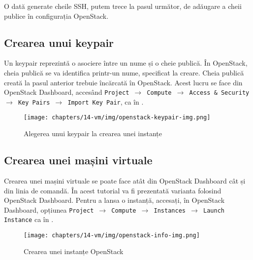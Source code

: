 
O dată generate cheile SSH, putem trece la pasul următor, de adăugare a cheii publice în configurația OpenStack.

\subsection{Crearea unui keypair}
\label{sec:vm:upb-openstack:keypares}

Un keypair reprezintă o asociere între un nume și o cheie publică. În OpenStack,
cheia publică se va identifica printr-un nume, specificat la creare. Cheia
publică creată la pasul anterior trebuie încărcată în OpenStack. Acest lucru se
face din OpenStack Dashboard, accesând \texttt{Project $\rightarrow$ Compute $\rightarrow$ Access \& Security $\rightarrow$ Key Pairs $\rightarrow$ Import Key Pair}, ca în .

\begin{figure}[!htbp]
	\centering
	\texttt{[image: chapters/14-vm/img/openstack-keypair-img.png]}
	\caption{Alegerea unui keypair la crearea unei instanțe}
	\label{fig:vm:openstack-keypair}
\end{figure}

\subsection{Crearea unei mașini virtuale}
\label{sec:vm:upb-openstack:createvm}

Crearea unei mașini virtuale se poate face atât din OpenStack Dashboard cât și
din linia de comandă. În acest tutorial va fi prezentată varianta folosind
OpenStack Dashboard. Pentru a lansa o instanță, accesați, în OpenStack Dashboard, opțiunea
\texttt{Project $\rightarrow$ Compute $\rightarrow$ Instances $\rightarrow$ Launch Instance} ca în .

\begin{figure}[!htbp]
	\centering
	\texttt{[image: chapters/14-vm/img/openstack-info-img.png]}
	\caption{Crearea unei instanțe OpenStack}
	\label{fig:vm:openstack-info-img}
\end{figure}

